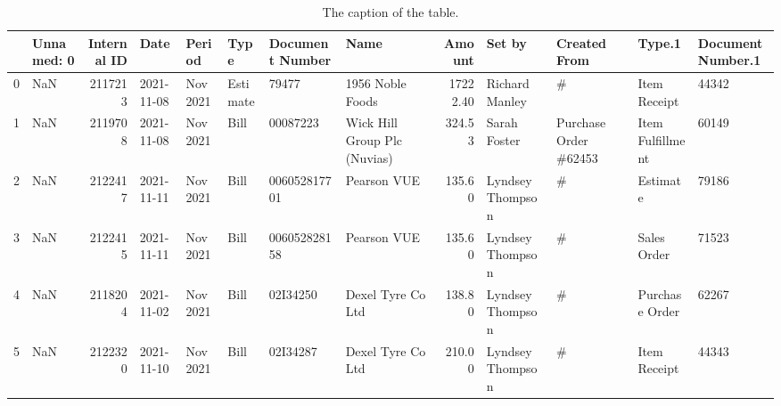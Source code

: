 \begin{table}[htb]
\small %
\begin{tabular}{l|p{2cm}|r|l|l|l|l|l|r|l|l|l|l}
\toprule
{} &  Unnamed: 0 &  Internal ID &       Date &    Period &                  Type &      Document Number &                                               Name &      Amount &            Set by &                       Created From &                Type.1 &    Document Number.1 \\
\midrule
0    &         NaN &      2117213 & 2021-11-08 &  Nov 2021 &              Estimate &                79477 &                                   1956 Noble Foods &    17222.40 &    Richard Manley &                                  \# &          Item Receipt &                44342 \\
1    &         NaN &      2119708 & 2021-11-08 &  Nov 2021 &                  Bill &             00087223 &                       Wick Hill Group Plc (Nuvias) &      324.53 &      Sarah Foster &              Purchase Order \#62453 &      Item Fulfillment &                60149 \\
2    &         NaN &      2122417 & 2021-11-11 &  Nov 2021 &                  Bill &         006052817701 &                                        Pearson VUE &      135.60 &  Lyndsey Thompson &                                  \# &              Estimate &                79186 \\
3    &         NaN &      2122415 & 2021-11-11 &  Nov 2021 &                  Bill &         006052828158 &                                        Pearson VUE &      135.60 &  Lyndsey Thompson &                                  \# &           Sales Order &                71523 \\
4    &         NaN &      2118204 & 2021-11-02 &  Nov 2021 &                  Bill &             02I34250 &                                  Dexel Tyre Co Ltd &      138.80 &  Lyndsey Thompson &                                  \# &        Purchase Order &                62267 \\
5    &         NaN &      2122320 & 2021-11-10 &  Nov 2021 &                  Bill &             02I34287 &                                  Dexel Tyre Co Ltd &      210.00 &  Lyndsey Thompson &                                  \# &          Item Receipt &                44343 \\
\bottomrule
\end{tabular}
\caption{The caption of the table.}
\label{table:dataformat}
\end{table}


